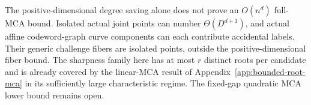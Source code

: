 The positive-dimensional degree saving alone does not prove an
$O(n^d)$ full-MCA bound. Isolated actual joint points can number
$\Theta(D^{d+1})$, and actual affine codeword-graph curve components
can each contribute accidental labels. Their generic challenge
fibers are isolated points, outside the positive-dimensional fiber
bound. The sharpness family here has at most $r$ distinct roots per
candidate and is already covered by the linear-MCA result of
Appendix~\ref{app:bounded-root-mca} in its sufficiently large
characteristic regime. The fixed-gap quadratic MCA lower bound
remains open.
